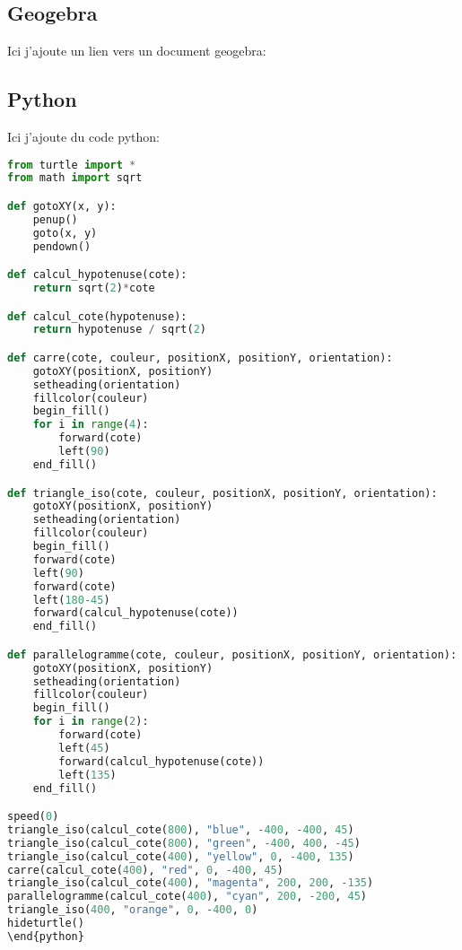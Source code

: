\documentclass[a4paper,11pt]{article}
\newcommand\geogebra[3]{%
\includemedia[%
src=#1,
width=#2,
height=#3,
activate=pageopen
]{}{VPlayer.swf}
}
\begin{document}
\subsection{Geogebra}
Ici j'ajoute un lien vers un document geogebra:\par
\geogebra{cpmbrfxg}{800}{600}

\subsection{Python}
Ici j'ajoute du code python:\par
\begin{lstlisting}[language=Python]
from turtle import *
from math import sqrt

def gotoXY(x, y):
    penup()
    goto(x, y)
    pendown()

def calcul_hypotenuse(cote):
    return sqrt(2)*cote

def calcul_cote(hypotenuse):
    return hypotenuse / sqrt(2)

def carre(cote, couleur, positionX, positionY, orientation):
    gotoXY(positionX, positionY)
    setheading(orientation)
    fillcolor(couleur)
    begin_fill()
    for i in range(4):
        forward(cote)
        left(90)
    end_fill()

def triangle_iso(cote, couleur, positionX, positionY, orientation):
    gotoXY(positionX, positionY)
    setheading(orientation)
    fillcolor(couleur)
    begin_fill()
    forward(cote)
    left(90)
    forward(cote)
    left(180-45)
    forward(calcul_hypotenuse(cote))
    end_fill()

def parallelogramme(cote, couleur, positionX, positionY, orientation):
    gotoXY(positionX, positionY)
    setheading(orientation)
    fillcolor(couleur)
    begin_fill()
    for i in range(2):
        forward(cote)
        left(45)
        forward(calcul_hypotenuse(cote))
        left(135)
    end_fill()

speed(0)
triangle_iso(calcul_cote(800), "blue", -400, -400, 45)
triangle_iso(calcul_cote(800), "green", -400, 400, -45)
triangle_iso(calcul_cote(400), "yellow", 0, -400, 135)
carre(calcul_cote(400), "red", 0, -400, 45)
triangle_iso(calcul_cote(400), "magenta", 200, 200, -135)
parallelogramme(calcul_cote(400), "cyan", 200, -200, 45)
triangle_iso(400, "orange", 0, -400, 0)
hideturtle()
\end{python}
\end{lstlisting}
\end{document}

